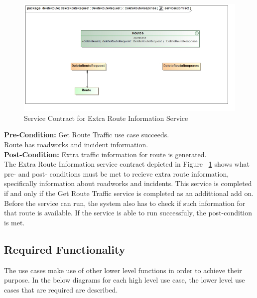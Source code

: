 \documentclass[a4paper,12pt]{article}
\begin{document}
\begin{figure}[here]
\includegraphics[width=\textwidth]{images/scDelete_Route.jpg}
\caption{Service Contract for Extra Route Information Service}
\label{fig:sc_extra}
\end{figure}

\textbf{Pre-Condition: }
Get Route Traffic use case succeeds.\\
Route has roadworks and incident information.\\
\textbf{Post-Condition: }
Extra traffic information for route is generated.\\

The Extra Route Information service contract depicted in Figure ~\ref{fig:sc_extra} shows what pre- and post- conditions must be met to recieve extra route information, specifically information about roadworks and incidents. This service is completed if and only if the Get Route Traffic service is completed as an addittional add on. Before the service can run, the system also has to check if such information for that route is available. If the service is able to run successfuly, the post-condition is met.

\subsection{Required Functionality}
The use cases make use of other lower level functions in order to achieve their purpose. In the below diagrams for each high level use case, the lower level use cases that are required are described.
\end{document}
